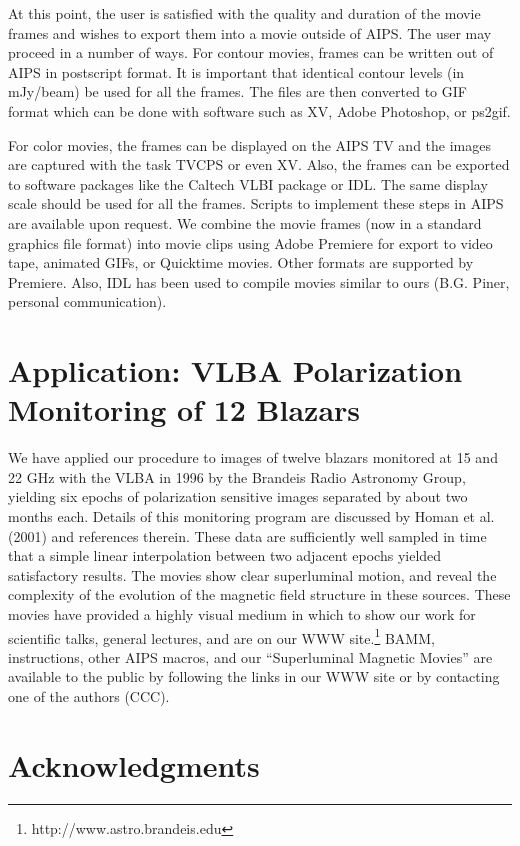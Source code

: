 \documentclass[twoside]{article}
\begin{document}
At this point, the user is satisfied with the quality and duration of the
movie frames and wishes to export them into a movie outside of AIPS.  The
user may proceed in a number of ways. For contour movies, frames can be
written out of AIPS in postscript format. It is important that identical
contour levels (in mJy/beam) be used for all the frames. The files are
then converted to GIF format which can be done with software such as XV,
Adobe Photoshop, or ps2gif.

For color movies, the frames can be displayed on the AIPS TV and the
images are captured with the task TVCPS or even XV. Also, the frames can
be exported to software packages like the Caltech VLBI package or IDL. The
same display scale should be used for all the frames. Scripts to implement
these steps in AIPS are available upon request.  We combine the movie
frames (now in a standard graphics file format) into movie clips using
Adobe Premiere for export to video tape, animated GIFs, or Quicktime
movies. Other formats are supported by Premiere. Also, IDL has been used
to compile movies similar to ours (B.G. Piner, personal communication).


\section{Application: VLBA Polarization Monitoring of 12 Blazars}
\label{application}

We have applied our procedure to images of twelve blazars monitored at 15
and 22 GHz with the VLBA in 1996 by the Brandeis Radio Astronomy Group,
yielding six epochs of polarization sensitive images separated by about
two months each. Details of this monitoring program are discussed by Homan
et al.  (2001) and references therein. These data are sufficiently well
sampled in time that a simple linear interpolation between two adjacent
epochs yielded satisfactory results. The movies show clear superluminal
motion, and reveal the complexity of the evolution of the magnetic field
structure in these sources. These movies have provided a highly visual
medium in which to show our work for scientific talks, general lectures,
and are on our WWW site.\footnote{http://www.astro.brandeis.edu} BAMM,
instructions, other AIPS macros, and our ``Superluminal Magnetic Movies''
are available to the public by following the links in our WWW site or by
contacting one of the authors (CCC).

\section{Acknowledgments}
\end{document}
